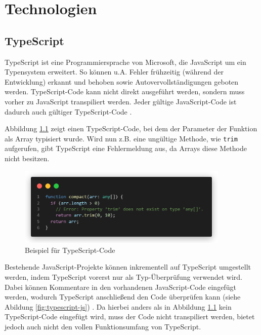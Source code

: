 \chapter{Technologien}

%
%
\section{TypeScript}
\label{sec:typescript}

TypeScript ist eine Programmiersprache von Microsoft, die JavaScript um ein Typensystem erweitert. So können u.A. Fehler frühzeitig (während der Entwicklung) erkannt und behoben sowie Autovervollständigungen geboten werden. TypeScript-Code kann nicht direkt ausgeführt werden, sondern muss vorher zu JavaScript transpiliert werden. Jeder gültige JavaScript-Code ist dadurch auch gültiger TypeScript-Code \cites[vgl.][]{TypeScript}[vgl.][]{TypeScriptForJSDevelopers}.

Abbildung \ref{fig:typescript} zeigt einen TypeScript-Code, bei dem der Parameter der Funktion als Array typisiert wurde. Wird nun z.B. eine ungültige Methode, wie \lstinline{trim} aufgerufen, gibt TypeScript eine Fehlermeldung aus, da Arrays diese Methode nicht besitzen.

\begin{figure}[H]
  \includegraphics[width=0.9\textwidth]{images/typescript-example.png}
  \centering
  \caption[Beispiel für TypeScript-Code]{Beispiel für TypeScript-Code}
  \label{fig:typescript}
\end{figure}

Bestehende JavaScript-Projekte können inkrementell auf TypeScript umgestellt werden, indem TypeScript vorerst nur als Typ-Überprüfung verwendet wird. Dabei können Kommentare in den vorhandenen JavaScript-Code eingefügt werden, wodurch TypeScript anschließend den Code überprüfen kann (siehe Abildung \ref{fig:typescript-js}) \cite[vgl.][]{TypeScript}. Da hierbei anders als in Abbildung \ref{fig:typescript} kein TypeScript-Code eingefügt wird, muss der Code nicht transpiliert werden, bietet jedoch auch nicht den vollen Funktionsumfang von TypeScript.

